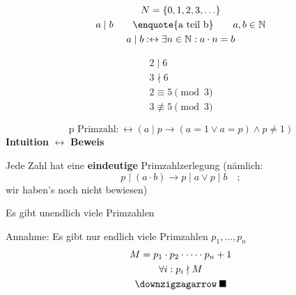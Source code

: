 \begin{bsp}[note = Zahlentheorie]
	\begin{gather*}
		N = \{ 0 , 1 , 2 , 3 , \ldots \} \\
 		a \mid b \qquad \text{\enquote{a teil b}} \qquad a , b \in \mathbb{N} \\
		a \mid b :\leftrightarrow \exists n \in \mathbb{N} : a \cdot n = b
	\end{gather*}

	\begin{bsp*}
		\begin{gather*}
			2 \mid 6 \\
			3 \nmid 6 \\
			2 \equiv 5 \pmod 3 \\
			3 \not\equiv 5 \pmod 3
		\end{gather*}
	\end{bsp*}
	\begin{equation*}
		\text{p Primzahl} :\leftrightarrow ( a \mid p \rightarrow ( a = 1 \vee a = p ) \wedge p \neq 1 )
	\end{equation*}
	\textbf{Intuition} $\leftrightarrow$ \textbf{Beweis}

	Jede Zahl hat eine \textbf{eindeutige} Primzahlzerlegung (nämlich: \[ p \mid (a \cdot b) \rightarrow p \mid a \vee p \mid b \quad ; \] wir haben's noch nicht bewiesen) \\
	\begin{satz*}
		Es gibt unendlich viele Primzahlen
		\begin{bew}[note = Euklid]
			Annahme: Es gibt nur endlich viele Primzahlen $p_1 , \ldots , p_n$
			\begin{gather*}
				M = p_1 \cdot p_2 \cdot \dotsm \cdot p_n + 1 \\
				\forall i : p_i \nmid M \\
				\text{\lightning} \: \blacksquare
			\end{gather*}
		\end{bew}
	\end{satz*}
\end{bsp}

